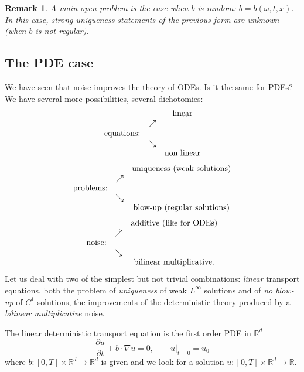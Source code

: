 \documentclass{article}
\newtheorem{remark}[theorem]{Remark}
\begin{document}
\begin{remark}
\emph{A main open problem is the case when $b$ is random:%
 $
 b=b\left(  \omega,t,x\right)
 $.
In this case, strong uniqueness statements of the previous form are unknown
(when $b$ is not regular). }
\end{remark}

\subsection{The PDE case}

We have seen that noise improves the theory of ODEs. Is it the same for PDEs?
We have several more possibilities, several dichotomies:%
\[%
\begin{array}
[c]{ccc}
&  & \text{linear}\\
& \nearrow & \\
\text{equations:} &  & \\
& \searrow & \\
&  & \text{non linear}%
\end{array}
\]%
\[%
\begin{array}
[c]{ccc}
&  & \text{uniqueness (weak solutions)}\\
& \nearrow & \\
\text{problems:} &  & \\
& \searrow & \\
&  & \text{blow-up (regular solutions)}%
\end{array}
\]%
\[%
\begin{array}
[c]{ccc}
&  & \text{additive (like for ODEs)}\\
& \nearrow & \\
\text{noise:} &  & \\
& \searrow & \\
&  & \text{bilinear multiplicative.}%
\end{array}
\]
Let us deal with two of the simplest but not trivial combinations:
\textit{linear} transport equations, both the problem of
\textit{uniqueness}
of weak $L^{\infty}$ solutions and of \textit{no blow-up} of $C^{1}%
$-solutions, the improvements of the deterministic theory produced by a
\textit{bilinear multiplicative} noise.

The linear deterministic transport equation is the first order PDE in
$\mathbb{R}^{d}$%
\[
\frac{\partial u}{\partial t}+b\cdot\nabla u=0,\qquad u|_{t=0}=u_{0}%
\]
where $b:\left[  0,T\right]  \times\mathbb{R}^{d}\rightarrow\mathbb{R}^{d}$ is
given and we look for a solution $u:\left[  0,T\right]  \times\mathbb{R}%
^{d}\rightarrow\mathbb{R}$.
\end{document}
